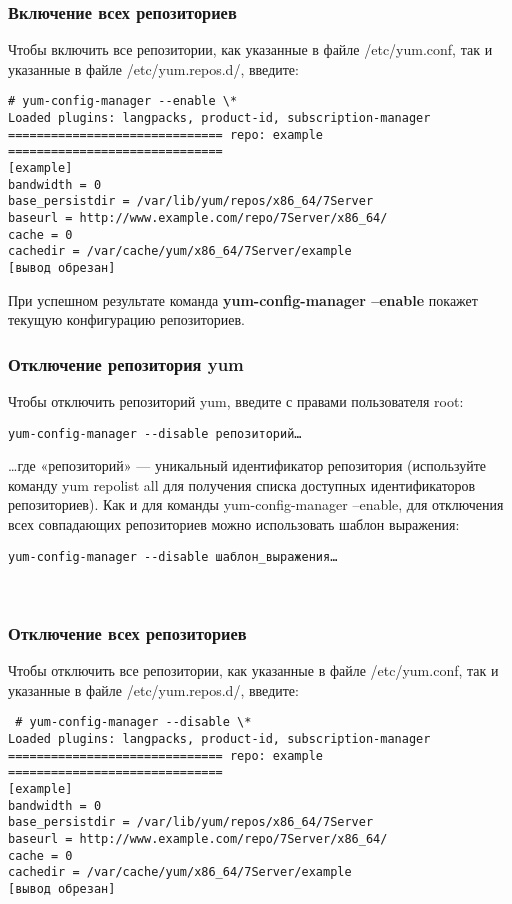 \documentclass[a4paper,10pt,twoside]{article}
\begin{document}
\subsubsection{Включение всех репозиториев}
Чтобы включить все репозитории, как указанные в файле /etc/yum.conf, так и указанные в файле /etc/yum.repos.d/, введите:
\begin{verbatim}
# yum-config-manager --enable \*
Loaded plugins: langpacks, product-id, subscription-manager
============================== repo: example ==============================
[example]
bandwidth = 0
base_persistdir = /var/lib/yum/repos/x86_64/7Server
baseurl = http://www.example.com/repo/7Server/x86_64/
cache = 0
cachedir = /var/cache/yum/x86_64/7Server/example
[вывод обрезан]
\end{verbatim} 

При успешном результате команда \textbf{yum-config-manager --enable} покажет текущую конфигурацию репозиториев.


\subsubsection{Отключение репозитория yum}
Чтобы отключить репозиторий yum, введите с правами пользователя root: 
\begin{verbatim}
yum-config-manager --disable репозиторий…
\end{verbatim} 
…где «репозиторий» — уникальный идентификатор репозитория (используйте команду yum repolist all для получения списка доступных идентификаторов репозиториев). Как и для команды yum-config-manager --enable, для отключения всех совпадающих репозиториев можно использовать шаблон выражения:
\begin{verbatim}
yum-config-manager --disable шаблон_выражения…
\end{verbatim} 

⁠
\subsubsection{Отключение всех репозиториев}
Чтобы отключить все репозитории, как указанные в файле /etc/yum.conf, так и указанные в файле /etc/yum.repos.d/, введите:
\begin{verbatim}
 # yum-config-manager --disable \*
Loaded plugins: langpacks, product-id, subscription-manager
============================== repo: example ==============================
[example]
bandwidth = 0
base_persistdir = /var/lib/yum/repos/x86_64/7Server
baseurl = http://www.example.com/repo/7Server/x86_64/
cache = 0
cachedir = /var/cache/yum/x86_64/7Server/example
[вывод обрезан]
\end{verbatim} 
\end{document}
